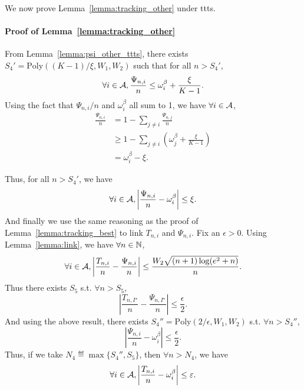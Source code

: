 We now prove Lemma~\ref{lemma:tracking_other} under \gls{ttts}.

\paragraph{Proof of Lemma~\ref{lemma:tracking_other}} 

From Lemma~\ref{lemma:psi_other_ttts}, there exists $S_4' = \text{Poly}((K-1)/\xi,W_1,W_2)$ such that for all $n > S_4'$,
\[
    \forall i\in\mathcal{A}, \frac{\Psi_{n,i}}{n} \leq \omega_i^\beta + \frac{\xi}{K-1}.
\]
Using the fact that $\Psi_{n,i}/n$ and $\omega_{i}^\beta$ all sum to 1, we have $\forall i \in \mathcal{A}$,
\begin{align*}
    \frac{\Psi_{n,i}}{n} &= 1 - \sum_{j\neq i} \frac{\Psi_{n,j}}{n}\\
                         &\geq 1 - \sum_{j\neq i} \left(\omega_j^\beta + \frac{\xi}{K-1}\right)\\
                         &= \omega_i^\beta - \xi.
\end{align*}

Thus, for all $n > S_4'$, we have
\[
    \forall i\in\mathcal{A}, \left| \frac{\Psi_{n,i}}{n} - \omega_i^\beta \right| \leq \xi.
\]
And finally we use the same reasoning as the proof of Lemma~\ref{lemma:tracking_best} to link $T_{n,i}$ and $\Psi_{n,i}$. Fix an $\epsilon > 0$. Using Lemma~\ref{lemma:link}, we have $\forall n\in{\mathbb N}$,
\[
    \forall i\in\mathcal{A}, \left|\frac{T_{n,i}}{n}-\frac{\Psi_{n,i}}{n}\right| \leq \frac{W_2\sqrt{(n+1)\log(e^2+n)}}{n}.
\]
Thus there exists $S_5$ s.t. $\forall n > S_5$,
\[
    \left|\frac{T_{n,I^\star}}{n}-\frac{\Psi_{n,I^\star}}{n}\right| \leq \frac{\epsilon}{2}.
\]
And using the above result, there exists $S_4'' = \text{Poly}(2/\epsilon,W_1,W_2)$ s.t. $\forall n > S_4''$,
\[
    \left|\frac{\Psi_{n,i}}{n} - \omega_i^\beta\right| \leq \frac{\epsilon}{2}.
\]
Thus, if we take $N_4 \eqdef \max\{S_4'',S_5\}$, then $\forall n > N_4$, we have
\[
    \forall i\in\mathcal{A}, \left|\frac{T_{n,i}}{n} - \omega_i^\beta\right| \leq \varepsilon.
\]

\hfill\BlackBox\\[2mm]
